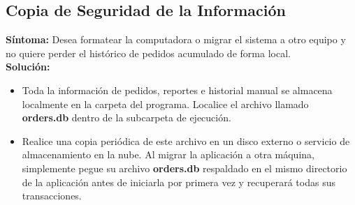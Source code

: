 \documentclass[11pt,a4paper]{article}
\begin{document}
\subsection{Copia de Seguridad de la Información}
\textbf{Síntoma:} Desea formatear la computadora o migrar el sistema a otro equipo y no quiere perder el histórico de pedidos acumulado de forma local.\\
\textbf{Solución:}
\begin{itemize}
    \item Toda la información de pedidos, reportes e historial manual se almacena localmente en la carpeta del programa. Localice el archivo llamado \textbf{orders.db} dentro de la subcarpeta de ejecución.
    \item Realice una copia periódica de este archivo en un disco externo o servicio de almacenamiento en la nube. Al migrar la aplicación a otra máquina, simplemente pegue su archivo \textbf{orders.db} respaldado en el mismo directorio de la aplicación antes de iniciarla por primera vez y recuperará todas sus transacciones.
\end{itemize}
\end{document}
